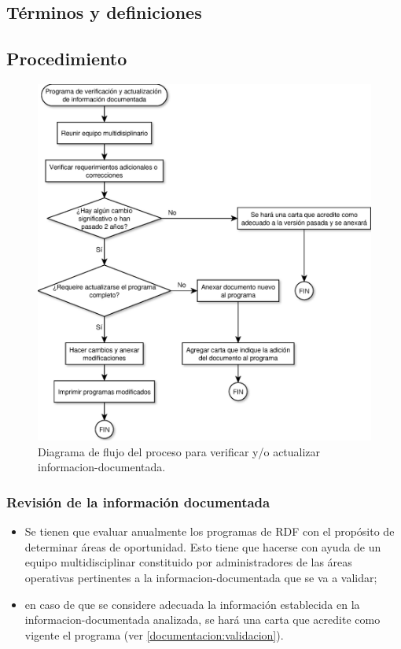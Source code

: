 \subsection{Términos y definiciones}
\begin{description}
\end{description}

\subsection{Procedimiento}
\begin{figure}[htb]
    \centering
    \includegraphics[width=0.5\linewidth]{src/diagramas/G1_AV1.eps}
    \caption{Diagrama de flujo del proceso para verificar y/o actualizar \gls{informacion-documentada}.}
\end{figure}

\subsubsection{Revisión de la información documentada}
\label{documentacion:revision}
\begin{itemize}
\item Se tienen que evaluar anualmente los programas de \gls{RDF} con el propósito de determinar áreas de oportunidad. Esto tiene que hacerse con ayuda de un equipo multidisciplinar constituido por administradores de las áreas operativas pertinentes a la \gls{informacion-documentada} que se va a validar;
\item en caso de que se considere adecuada la información establecida en la \gls{informacion-documentada} analizada, se hará una carta que acredite como vigente el programa (ver \cref{documentacion:validacion}).
\end{itemize}

